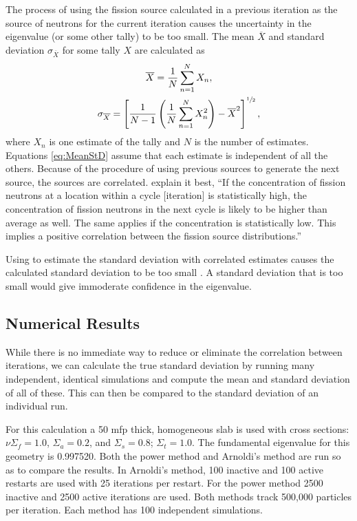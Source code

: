 The process of using the fission source calculated in a previous iteration as the source of neutrons for the current iteration causes the uncertainty in the eigenvalue (or some other tally) to be too small.  The mean $\overline{X}$ and standard deviation $\sigma_{\overline{X}}$ for some tally $X$ are calculated as
\begin{subequations}
    \begin{gather}
        \overline{X} = \frac{1}{N}\sum_{n=1}^N X_n, \label{eq:Mean} \\
        \sigma_{\overline{X}} = \left[\frac{1}{N-1}\left(\frac{1}{N}\sum_{n=1}^NX_n^2\right) - \overline{X}^2\right]^{\sfrac{1}{2}}, \label{eq:StD}
    \end{gather}
    \label{eq:MeanStD}
\end{subequations}
where $X_n$ is one estimate of the tally and $N$ is the number of estimates.  Equations \eqref{eq:MeanStD} assume that each estimate is independent of all the others.  Because of the procedure of using previous sources to generate the next source, the sources are correlated.  \citet{Kiedrowski:1009An-In-0} explain it best, ``If the concentration of fission neutrons at a location within a cycle [iteration] is statistically high, the concentration of fission neutrons in the next cycle is likely to be higher than average as well.  The same applies if the concentration is statistically low.  This implies a positive correlation between the fission source distributions.''

Using  to estimate the standard deviation with correlated estimates causes the calculated standard deviation to be too small \cite[see][]{Brown:2009A-Rev-0}.  A standard deviation that is too small would give immoderate confidence in the eigenvalue.  

\subsection{Numerical Results}
While there is no immediate way to reduce or eliminate the correlation between iterations, we can calculate the true standard deviation by running many independent, identical simulations and compute the mean and standard deviation of all of these.  This can then be compared to the standard deviation of an individual run.  

For this calculation a 50 mfp thick, homogeneous slab is used with cross sections: \mbox{$\nu\Sigma_f = 1.0$}, \mbox{$\Sigma_a = 0.2$}, and \mbox{$\Sigma_s = 0.8$}; \mbox{$\Sigma_t = 1.0$}.  The fundamental eigenvalue for this geometry is 0.997520.  Both the power method and Arnoldi's method are run so as to compare the results.  In Arnoldi's method, 100 inactive and 100 active restarts are used with 25 iterations per restart.  For the power method 2500 inactive and 2500 active iterations are used.  Both methods track 500,000 particles per iteration.  Each method has 100 independent simulations.

